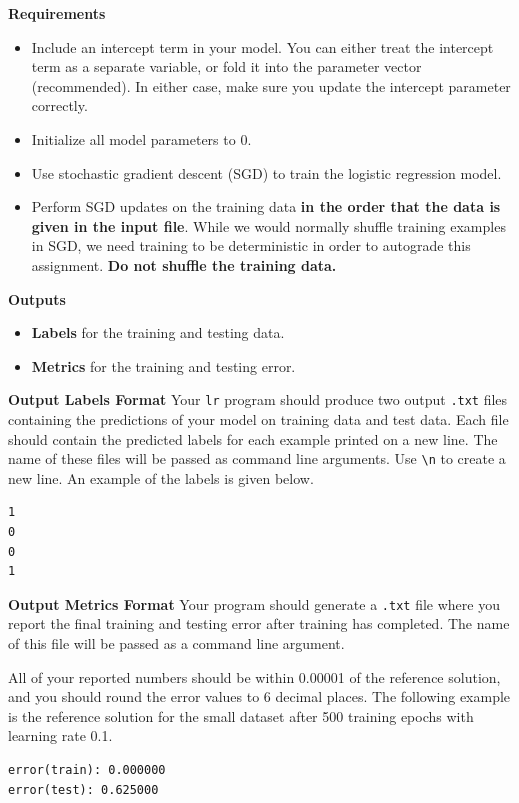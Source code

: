 \documentclass[11pt,addpoints,answers]{exam}
\begin{document}
{\bf Requirements }
\begin{itemize}
    \item Include an intercept term in your model. You can either treat the intercept term as a separate variable, or fold it into the parameter vector (recommended). In either case, make sure you update the intercept parameter correctly.
    \item Initialize all model parameters to 0.
    \item Use stochastic gradient descent (SGD) to train the logistic regression model.
    \item Perform SGD updates on the training data \textbf{in the order that the data is given in the input file}. While we would normally shuffle training examples in SGD, we need training to be deterministic in order to autograde this assignment. \textbf{Do not shuffle the training data.}
\end{itemize}

{\bf Outputs }
\begin{itemize}
    \item \textbf{Labels} for the training and testing data.
    \item \textbf{Metrics} for the training and testing error.
\end{itemize}

{\bf Output Labels Format }
Your \lstinline{lr} program should produce two output \texttt{.txt} files containing the predictions of your model on training data and test data. Each file should contain the predicted labels for each example printed on a new line. The name of these files will be passed as command line arguments. Use \lstinline{\n} to create a new line. An example of the labels is given below.

\begin{lstlisting}
1
0
0
1
\end{lstlisting}

{\bf Output Metrics Format }
Your program should generate a \texttt{.txt} file where you report the final training and testing error after training has completed. The name of this file will be passed as a command line argument.

All of your reported numbers should be within 0.00001 of the reference solution, and you should round the error values to 6 decimal places. The following example is the reference solution for the small dataset after 500 training epochs with learning rate 0.1.
\begin{lstlisting}
error(train): 0.000000
error(test): 0.625000
\end{lstlisting}
\end{document}
